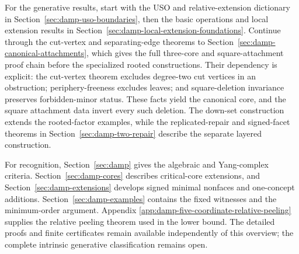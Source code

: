 \documentclass[11pt]{article}
\numberwithin{equation}{section}
\theoremstyle{definition}
\theoremstyle{remark}
\begin{document}
For the generative results, start with the USO and relative-extension
dictionary in Section~\ref{sec:damp-uso-boundaries}, then the basic operations and
local extension results in
Section~\ref{sec:damp-local-extension-foundations}.  Continue through
the cut-vertex and separating-edge theorems to
Section~\ref{sec:damp-canonical-attachments}, which gives the full
three-core and square-attachment proof chain before the specialized
rooted constructions.  Their dependency is explicit: the cut-vertex
theorem excludes degree-two cut vertices in an obstruction;
periphery-freeness excludes leaves; and square-deletion invariance
preserves forbidden-minor status.  These facts yield the canonical core,
and the square attachment data invert every such deletion.  The down-set construction extends the
rooted-factor examples, while the replicated-repair and signed-facet
theorems in Section~\ref{sec:damp-two-repair} describe the separate
layered construction.

For recognition, Section~\ref{sec:damp} gives the algebraic and
Yang-complex criteria.  Section~\ref{sec:damp-cores} describes
critical-core extensions, and Section~\ref{sec:damp-extensions}
develops signed minimal nonfaces and one-concept additions.
Section~\ref{sec:damp-examples} contains the fixed witnesses and the
minimum-order argument.  Appendix
\ref{app:damp-five-coordinate-relative-peeling} supplies the relative
peeling theorem used in the lower bound.  The detailed proofs and
finite certificates remain available independently of this overview;
the complete intrinsic generative classification remains open.





\end{document}
